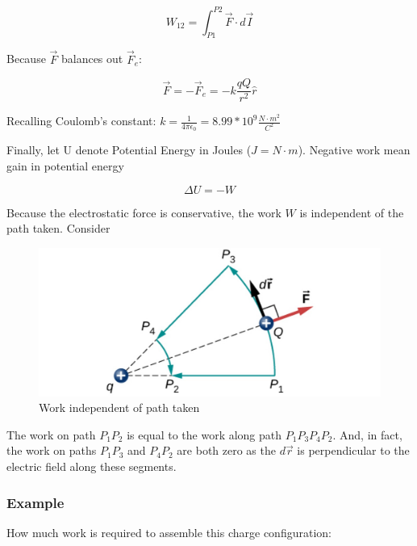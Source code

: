 \documentclass[14pt]{memoir}
\begin{document}
\begin{equation}
W_{12} = \int_{P1}^{P2} \vec{F} \cdot d\vec{I}
\end{equation}

Because $\vec{F}$ balances out $\vec{F}_e$:

\begin{equation}
\vec{F} = -\vec{F}_e = -k\frac{qQ}{r^2}\hat{r} 
\end{equation}

Recalling Coulomb's constant: $k = \frac{1}{4 \pi \epsilon_0} = 8.99 * 10^9 \frac{N \cdot m^2}{C^2}$

Finally, let U denote Potential Energy in Joules ($J = N \cdot m$). Negative work mean gain in potential energy

\begin{equation}
\Delta U = - W
\end{equation}

Because the electrostatic force is conservative, the work $W$ is independent of the path taken. Consider

\begin{figure}[H]
\begin{center}
\includegraphics[scale=0.40]{fig/fig_07_05.jpg}
\caption{Work independent of path taken}
\label{fig:07_05}
\end{center}
\end{figure}

The work on path $P_1 P_2$ is equal to the work along path $P_1 P_3 P_4 P_2$. And, in fact, the work on paths $P_1 P_3$ and $P_4 P_2$ are both zero as the $d\vec{r}$ is perpendicular to the electric field along these segments.

\subsubsection{Example}

How much work is required to assemble this charge configuration:
\end{document}
